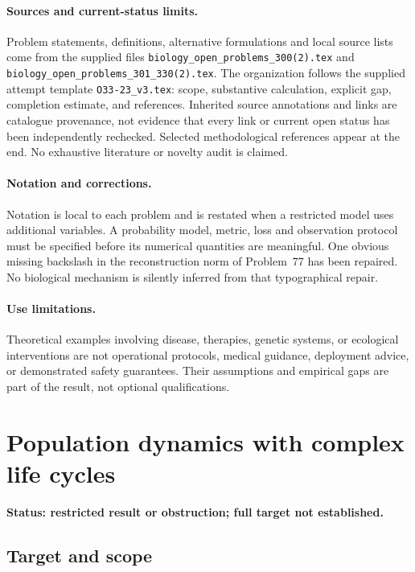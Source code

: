 \documentclass[11pt]{article}
\begin{document}
\paragraph{Sources and current-status limits.}
Problem statements, definitions, alternative formulations and local source lists
come from the supplied files
\texttt{biology\_open\_problems\_300(2).tex} and
\texttt{biology\_open\_problems\_301\_330(2).tex}.
The organization follows the supplied attempt template
\texttt{O33-23\_v3.tex}: scope, substantive calculation, explicit gap,
completion estimate, and references. Inherited source annotations and links are
catalogue provenance, not evidence that every link or current open status has
been independently rechecked. Selected methodological references appear at the
end. No exhaustive literature or novelty audit is claimed.

\paragraph{Notation and corrections.}
Notation is local to each problem and is restated when a restricted model uses
additional variables. A probability model, metric, loss and observation protocol
must be specified before its numerical quantities are meaningful. One obvious
missing backslash in the reconstruction norm of Problem~77 has been repaired.
No biological mechanism is silently inferred from that typographical repair.

\paragraph{Use limitations.}
Theoretical examples involving disease, therapies, genetic systems, or ecological
interventions are not operational protocols, medical guidance, deployment advice,
or demonstrated safety guarantees. Their assumptions and empirical gaps are part
of the result, not optional qualifications.


\section*{Population dynamics with complex life cycles}
\label{prob:185}
\noindent\textbf{Status: restricted result or obstruction; full target not established.}
\subsection{Target and scope}
\end{document}
